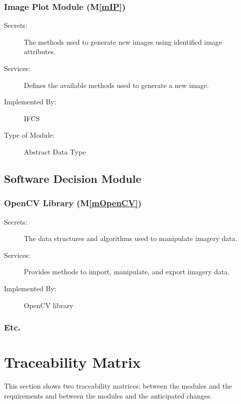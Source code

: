 \documentclass[12pt, titlepage]{article}
\newcommand{\mref}[1]{M\ref{#1}}
\begin{document}
\subsubsection{Image Plot Module (\mref{mIP})}
\begin{description}
\item[Secrets:]The methods used to generate new images using identified image attributes.
\item[Services:]Defines the available methods used to generate a new image.
\item[Implemented By:] IFCS
\item[Type of Module:] Abstract Data Type
\end{description}

\subsection{Software Decision Module}

\subsubsection{OpenCV Library (\mref{mOpenCV})}
\begin{description}
\item[Secrets:] The data structures and algorithms used to manipulate imagery data.
\item[Services:] Provides methods to import, manipulate, and export imagery data.
\item[Implemented By:] OpenCV library
\end{description}
\subsubsection{Etc.}

\section{Traceability Matrix} \label{SecTM}

This section shows two traceability matrices: between the modules and the
requirements and between the modules and the anticipated changes.
\end{document}
